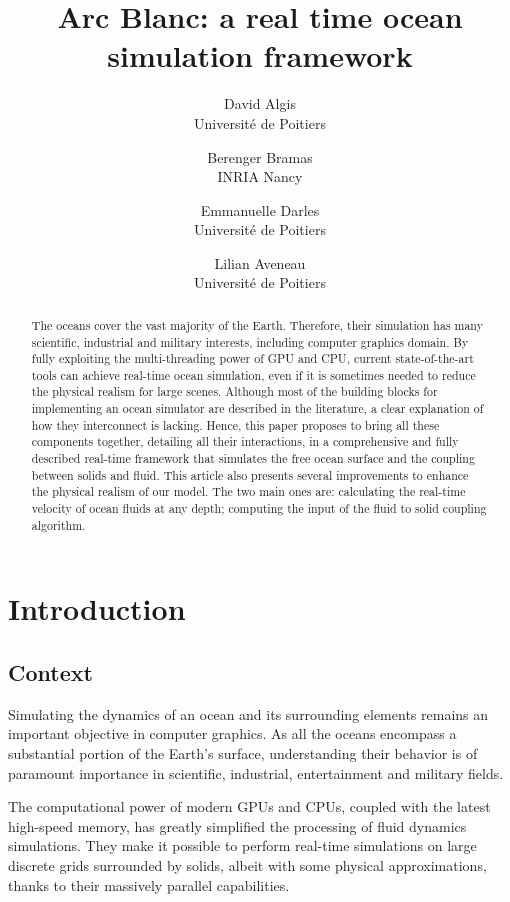 \documentclass[final]{jcgt}
\title{Arc Blanc: a real time ocean simulation framework}
\author{%
    David Algis\\Université de Poitiers%
    \and Berenger Bramas\\INRIA Nancy
    \and Emmanuelle Darles\\Université de Poitiers%
    \and Lilian Aveneau\\Université de Poitiers%
}
\begin{document}
\thispagestyle{firstpagestyle}

\maketitle

\begin{abstract}
	\small
	The oceans cover the vast majority of the Earth.
	Therefore, their simulation has many scientific, industrial and military interests, including computer graphics domain.
	By fully exploiting the multi-threading power of GPU and CPU, current state-of-the-art tools can achieve real-time ocean simulation, even if it is sometimes needed to reduce the physical realism for large scenes.
	Although most of the building blocks for implementing an ocean simulator are described in the literature, a clear explanation of how they interconnect is lacking.
	Hence, this paper proposes to bring all these components together, detailing all their interactions, in a comprehensive and fully described real-time framework that simulates the free ocean surface and the coupling between solids and fluid.
	This article also presents several improvements to enhance the physical realism of our model. 
	The two main ones are: 
	calculating the real-time velocity of ocean fluids at any depth; 
	computing the input of the fluid to solid coupling algorithm.
\end{abstract}

\section{Introduction}
\label{sec:introduction}

\subsection{Context}
\label{subsec:intro-context}
Simulating the dynamics of an ocean and its surrounding elements remains an important objective in computer graphics.
As all the oceans encompass a substantial portion of the Earth's surface, understanding their behavior is of paramount importance in scientific, industrial, entertainment and military fields.

The computational power of modern GPUs and CPUs, coupled with the latest high-speed memory, has greatly simplified the processing of fluid dynamics simulations.
They make it possible to perform real-time simulations on large discrete grids surrounded by solids, albeit with some physical approximations, thanks to their massively parallel capabilities.
\end{document}
